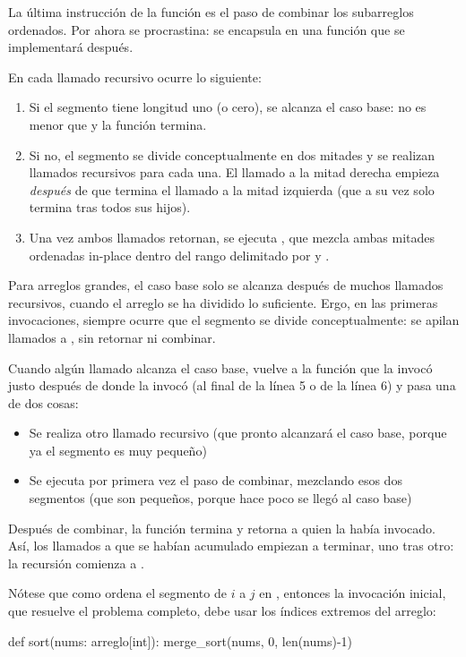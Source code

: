 La última instrucción de la función es el paso de combinar los subarreglos ordenados. Por ahora se procrastina: se encapsula en una función  que se implementará después.

En cada llamado recursivo ocurre lo siguiente:
\begin{enumerate}
    \item Si el segmento tiene longitud uno (o cero), se alcanza el caso base:  no es menor que  y la función termina.
    \item Si no, el segmento se divide conceptualmente en dos mitades y se realizan llamados recursivos para cada una. El llamado a la mitad derecha empieza \emph{después} de que termina el llamado a la mitad izquierda (que a su vez solo termina tras todos sus hijos).
    \item Una vez ambos llamados retornan, se ejecuta , que mezcla ambas mitades ordenadas in-place dentro del rango delimitado por  y .
\end{enumerate}

Para arreglos grandes, el caso base solo se alcanza después de muchos llamados recursivos, cuando el arreglo se ha dividido lo suficiente. Ergo, en las primeras invocaciones, siempre ocurre que el segmento se divide conceptualmente: se apilan llamados a , sin retornar ni combinar.

Cuando algún llamado alcanza el caso base, vuelve a la función que la invocó justo después de donde la invocó (al final de la línea 5 o de la línea 6) y pasa una de dos cosas:
\begin{itemize}
    \item Se realiza otro llamado recursivo (que pronto alcanzará el caso base, porque ya el segmento es muy pequeño)
    \item Se ejecuta por primera vez el paso de combinar, mezclando esos dos segmentos (que son pequeños, porque hace poco se llegó al caso base)
\end{itemize}
Después de combinar, la función termina y retorna a quien la había invocado. Así, los llamados a  que se habían acumulado empiezan a terminar, uno tras otro: la recursión comienza a .

Nótese que como  ordena el segmento de \(i\) a \(j\) en , entonces la invocación inicial, que resuelve el problema completo, debe usar los índices extremos del arreglo: 
\begin{codeblock}
\begin{pseudocode}
def sort(nums: arreglo[int]):
    merge_sort(nums, 0, len(nums)-1)
\end{pseudocode}
\end{codeblock}

